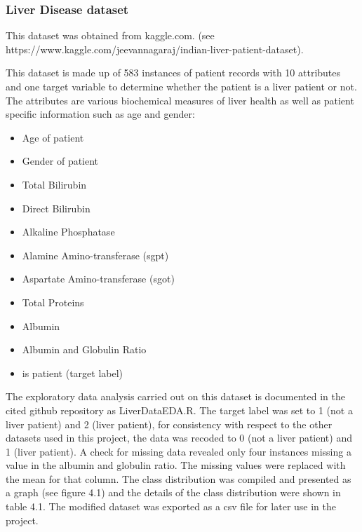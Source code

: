 \subsubsection{Liver Disease dataset}
This dataset was obtained from kaggle.com.\newline
(see https://www.kaggle.com/jeevannagaraj/indian-liver-patient-dataset). \newline

This dataset is made up of 583 instances of patient records with 10 attributes and one target variable to determine whether the patient is a liver patient or not. The attributes are various biochemical measures of liver health as well as patient specific information such as age and gender:
\begin{itemize}
    \item Age of patient
    \item Gender of patient
    \item Total Bilirubin
    \item Direct Bilirubin
    \item Alkaline Phosphatase
    \item Alamine Amino-transferase (sgpt)
    \item Aspartate Amino-transferase (sgot)
    \item Total Proteins
    \item Albumin
    \item Albumin and Globulin Ratio
    \item is patient (target label)
\end{itemize}

The exploratory data analysis carried out on this dataset is documented in the cited github repository as LiverDataEDA.R.\newline
The target label was set to 1 (not a liver patient) and 2 (liver patient), for consistency with respect to the other datasets used in this project, the data was recoded to 0 (not a liver patient) and 1 (liver patient).\newline
A check for missing data revealed only four instances missing a value in the albumin and globulin ratio. The missing values were replaced with the mean for that column.\newline
The class distribution was compiled and presented as a graph (see figure 4.1) and the details of the class distribution were shown in table 4.1. The modified dataset was exported as a csv file for later use in the project.\newline

